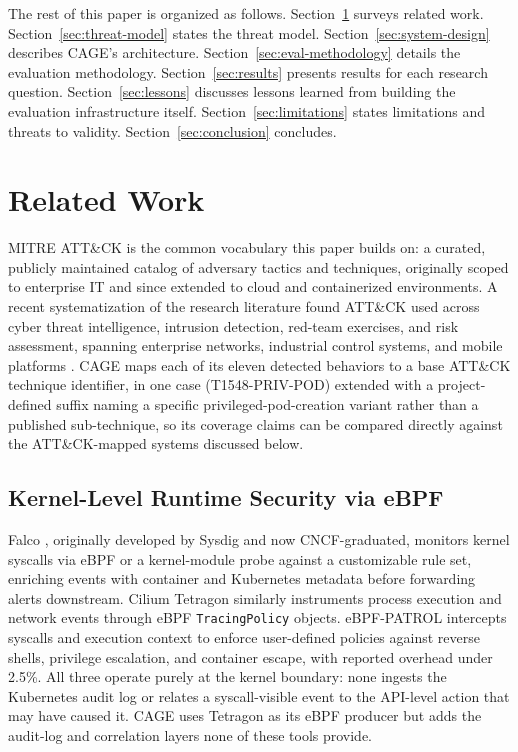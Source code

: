 \documentclass{ieeeaccess}
\begin{document}
The rest of this paper is organized as follows. Section~\ref{sec:related-work} surveys
related work. Section~\ref{sec:threat-model} states the threat model. Section~\ref{sec:system-design} describes
CAGE's architecture. Section~\ref{sec:eval-methodology} details the evaluation methodology.
Section~\ref{sec:results} presents results for each research question. Section~\ref{sec:lessons}
discusses lessons learned from building the evaluation infrastructure
itself. Section~\ref{sec:limitations} states limitations and threats to validity.
Section~\ref{sec:conclusion} concludes.

\section{Related Work}
\label{sec:related-work}

MITRE ATT\&CK \cite{ref9} is the common vocabulary this paper builds on: a
curated, publicly maintained catalog of adversary tactics and
techniques, originally scoped to enterprise IT and since extended to
cloud and containerized environments. A recent systematization of the
research literature found ATT\&CK used across cyber threat intelligence,
intrusion detection, red-team exercises, and risk assessment, spanning
enterprise networks, industrial control systems, and mobile platforms
\cite{ref10}. CAGE maps each of its eleven detected behaviors to a base ATT\&CK
technique identifier, in one case (T1548-PRIV-POD) extended with a
project-defined suffix naming a specific privileged-pod-creation
variant rather than a published sub-technique, so its coverage claims
can be compared directly against the
ATT\&CK-mapped systems discussed below.

\subsection{Kernel-Level Runtime Security via eBPF}
\label{subsec:rw-ebpf}

Falco \cite{ref1}, originally developed by Sysdig and now CNCF-graduated,
monitors kernel syscalls via eBPF or a kernel-module probe against a
customizable rule set, enriching events with container and Kubernetes
metadata before forwarding alerts downstream. Cilium Tetragon \cite{ref2}
similarly instruments process execution and network events through
eBPF \texttt{TracingPolicy} objects. eBPF-PATROL \cite{ref11} intercepts syscalls and
execution context to enforce user-defined policies against reverse
shells, privilege escalation, and container escape, with reported
overhead under 2.5\%. All three operate purely at the kernel boundary:
none ingests the Kubernetes audit log or relates a syscall-visible
event to the API-level action that may have caused it. CAGE uses
Tetragon as its eBPF producer but adds the audit-log and correlation
layers none of these tools provide.
\end{document}
